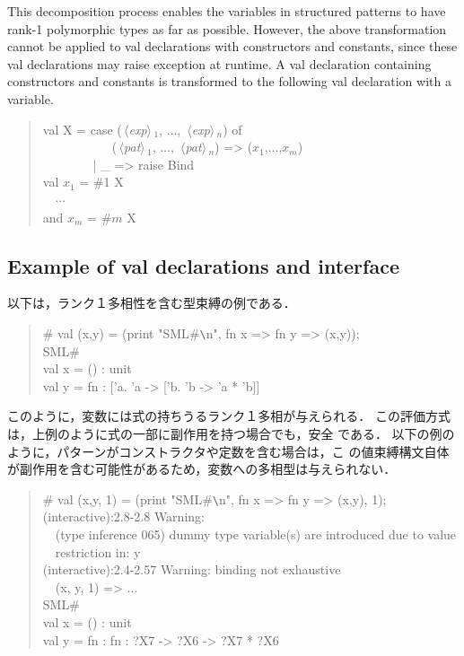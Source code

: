 \documentclass{jbook}
\newcommand{\txt}[2]{#2}
\newcommand{\nonterm}[1]{\mbox{$\,\langle$}{\it #1}\mbox{$\rangle\,$}}
\newcommand{\myem}{\mbox{\ \ }}
\newenvironment{program}{\begin{quote}\begin{tt}}%
                        {\end{tt}\end{quote}}
\begin{document}
	This decomposition process enables the variables in structured
patterns to have rank-1 polymorphic types as far as possible.
	However, the above transformation cannot be applied
to val declarations with constructors and constants, since these val
declarations may raise exception at runtime.
	A val declaration containing constructors and constants is 
transformed to the following val declaration with a variable.
\begin{program}
  val X = case (\nonterm{exp}$_1$, $\ldots$, \nonterm{exp}$_n$) of\\
  \myem\myem\myem\myem\ \ \ (\nonterm{pat}$_1$, $\ldots$, \nonterm{pat}$_n$) => ($x_1$,$\ldots$,$x_m$)\\
  \myem\myem\myem\myem | \_ => raise Bind\\
  val $x_1$ = \#1 X\\
  \myem $\cdots$\\
  and $x_m$ = \#$m$ X
\end{program}
\fi%

\subsection{\txt{val宣言とインタフェイスの例}{Example of val declarations and interface}}
\label{sec:valuBindings:examples}
\ifjp%

	以下は，ランク１多相性を含む型束縛の例である．
\begin{program}
  \# val (x,y) = (print "SML\#\verb|\|n", fn x => fn y => (x,y));\\
  SML\#\\
  val x = () : unit\\
  val y = fn : ['a. 'a -> ['b. 'b -> 'a * 'b]]
\end{program}
	このように，変数には式の持ちうるランク１多相が与えられる．
	この評価方式は，上例のように式の一部に副作用を持つ場合でも，安全
である．
	以下の例のように，パターンがコンストラクタや定数を含む場合は，こ
の値束縛構文自体が副作用を含む可能性があるため，変数への多相型は与えられない．
\begin{program}
  \# val (x,y, 1) = (print "SML\#\verb|\|n", fn x => fn y => (x,y), 1);\\
  (interactive):2.8-2.8 Warning:\\
  \myem (type inference 065) dummy type variable(s) are introduced due to value\\
  \myem restriction in: y\\
  (interactive):2.4-2.57 Warning: binding not exhaustive\\
  \myem  (x, y, 1) => ...\\
  SML\#\\
  val x = () : unit\\
  val y = fn : fn : ?X7 -> ?X6 -> ?X7 * ?X6
\end{program}
\end{document}
